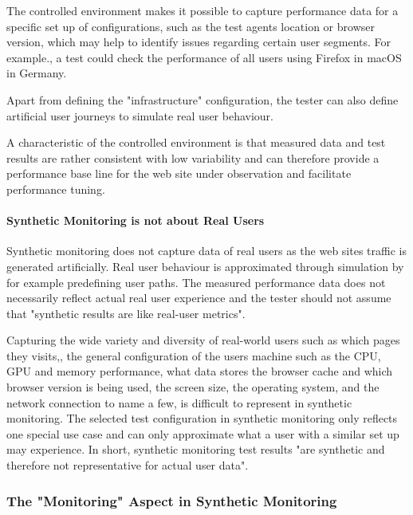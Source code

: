 The controlled environment makes it possible to capture performance data for a specific set up of configurations, such as the test agents location or browser version, which may help to identify issues regarding certain user segments.  For example., a test could check the performance of all users using Firefox in macOS in Germany. %

Apart from defining the "infrastructure" configuration, the tester can also define artificial user journeys to simulate real user behaviour. %

A characteristic of the controlled environment is that measured data and test results are rather consistent with low variability and can therefore provide a performance base line for the web site under observation and facilitate performance tuning.%


\paragraph{Synthetic Monitoring is not about Real Users}

Synthetic monitoring does not capture data of real users as the web sites traffic is generated artificially.
Real user behaviour is approximated through simulation by for example predefining user paths.
The measured performance data does not necessarily reflect actual real user experience and the tester should not assume that "synthetic results are like real-user metrics". %

Capturing the wide variety and diversity of real-world users such as which pages they visits,, the general configuration of the users machine such as the CPU, GPU and memory performance, what data stores the browser cache and which browser version is being used, the screen size, the operating system, and the network connection to name a few, is difficult to represent in synthetic monitoring. %
The selected test configuration in synthetic monitoring only reflects one special use case and can only approximate what a user with a similar set up may experience. %
In short, synthetic monitoring test results "are synthetic and therefore not representative for actual user data".  %



\subsubsection{The "Monitoring" Aspect in Synthetic Monitoring}


